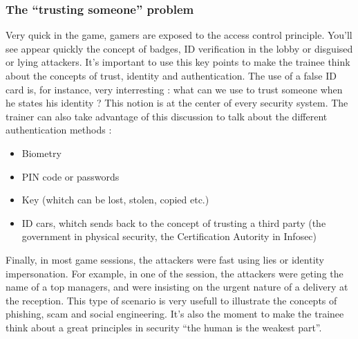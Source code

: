\documentclass[11pt]{article} %
\begin{document}
\subsubsection{The ``trusting someone'' problem}
Very quick in the game, gamers are exposed to the access control principle. 
You'll see appear quickly the concept of badges, ID verification in the lobby or 
disguised or lying attackers. It's important to use this key points to make the 
trainee think about the concepts of trust, identity and authentication. The use 
of a false ID card is, for instance, very interresting : what can we use to trust 
someone when he states his identity ? This notion is at the center of every 
security system. The trainer can also take advantage of this discussion to talk 
about the different authentication methods : 
\begin{itemize}
\item Biometry
\item PIN code or passwords
\item Key (whitch can be lost, stolen, copied etc.)
\item ID cars, whitch sends back to the concept of trusting a third party 
(the government in physical security, the Certification Autority in Infosec)
\end{itemize}

Finally, in most game sessions, the attackers were fast using lies or identity impersonation.
For example, in one of the session, the attackers were geting the name of a top managers, 
and were insisting on the urgent nature of a delivery at the reception. This type of scenario 
is very usefull to illustrate the concepts of phishing, scam and social engineering. 
It's also the moment to make the trainee think about a great principles in security 
``the human is the weakest part''. 
\end{document}
